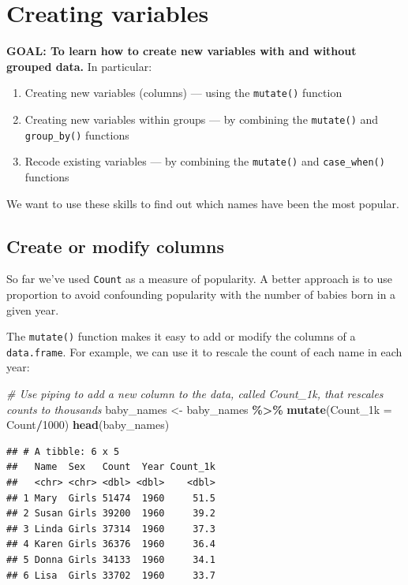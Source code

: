 \documentclass[
]{book}
\newenvironment{Shaded}{\begin{snugshade}}{\end{snugshade}}
\newcommand{\CommentTok}[1]{\textcolor[rgb]{0.56,0.35,0.01}{\textit{#1}}}
\newcommand{\DataTypeTok}[1]{\textcolor[rgb]{0.13,0.29,0.53}{#1}}
\newcommand{\DecValTok}[1]{\textcolor[rgb]{0.00,0.00,0.81}{#1}}
\newcommand{\KeywordTok}[1]{\textcolor[rgb]{0.13,0.29,0.53}{\textbf{#1}}}
\newcommand{\NormalTok}[1]{#1}
\newcommand{\OperatorTok}[1]{\textcolor[rgb]{0.81,0.36,0.00}{\textbf{#1}}}
\newcommand{\StringTok}[1]{\textcolor[rgb]{0.31,0.60,0.02}{#1}}
\providecommand{\tightlist}{%
  \setlength{\itemsep}{0pt}\setlength{\parskip}{0pt}}
\begin{document}
\hypertarget{creating-variables}{%
\section{Creating variables}\label{creating-variables}}

\textbf{GOAL: To learn how to create new variables with and without grouped data.} In particular:

\begin{enumerate}
\def\labelenumi{\arabic{enumi}.}
\tightlist
\item
  Creating new variables (columns) --- using the \texttt{mutate()} function
\item
  Creating new variables within groups --- by combining the \texttt{mutate()} and \texttt{group\_by()} functions
\item
  Recode existing variables --- by combining the \texttt{mutate()} and \texttt{case\_when()} functions
\end{enumerate}

We want to use these skills to find out which names have been the most popular.

\hypertarget{create-or-modify-columns}{%
\subsection{Create or modify columns}\label{create-or-modify-columns}}

So far we've used \texttt{Count} as a measure of popularity. A better approach is to use proportion to avoid confounding popularity with the number of babies born in a given year.

The \texttt{mutate()} function makes it easy to add or modify the columns of a \texttt{data.frame}. For example, we can use it to rescale the count of each name in each year:

\begin{Shaded}
\begin{Highlighting}[]
\CommentTok{\# Use piping to add a new column to the data, called Count\_1k, that rescales counts to thousands}
\NormalTok{baby\_names \textless{}{-}}\StringTok{ }\NormalTok{baby\_names }\OperatorTok{\%\textgreater{}\%}\StringTok{ }\KeywordTok{mutate}\NormalTok{(}\DataTypeTok{Count\_1k =}\NormalTok{ Count}\OperatorTok{/}\DecValTok{1000}\NormalTok{)}
\KeywordTok{head}\NormalTok{(baby\_names) }
\end{Highlighting}
\end{Shaded}

\begin{verbatim}
## # A tibble: 6 x 5
##   Name  Sex   Count  Year Count_1k
##   <chr> <chr> <dbl> <dbl>    <dbl>
## 1 Mary  Girls 51474  1960     51.5
## 2 Susan Girls 39200  1960     39.2
## 3 Linda Girls 37314  1960     37.3
## 4 Karen Girls 36376  1960     36.4
## 5 Donna Girls 34133  1960     34.1
## 6 Lisa  Girls 33702  1960     33.7
\end{verbatim}
\end{document}
